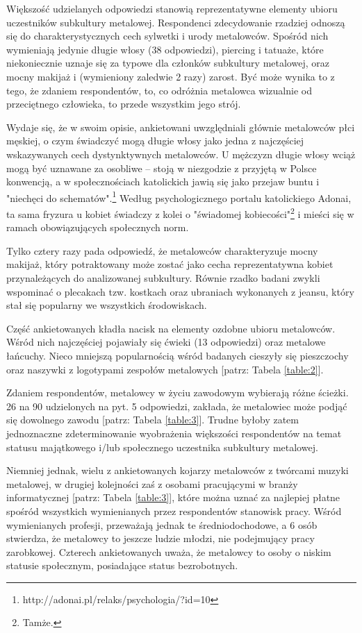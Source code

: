 \documentclass[12pt, a4paper, titlepage]{report}
\begin{document}
Większość udzielanych odpowiedzi stanowią reprezentatywne elementy ubioru uczestników subkultury metalowej. Respondenci zdecydowanie rzadziej odnoszą się do charakterystycznych cech sylwetki i urody metalowców. Spośród nich wymieniają jedynie długie włosy (38 odpowiedzi), piercing i tatuaże, które niekoniecznie uznaje się za typowe dla członków subkultury metalowej, oraz mocny makijaż i (wymieniony zaledwie 2 razy) zarost. Być może wynika to z tego, że zdaniem respondentów, to, co odróżnia metalowca wizualnie od przeciętnego człowieka, to przede wszystkim jego strój. 

Wydaje się, że w swoim opisie, ankietowani uwzględniali głównie metalowców płci męskiej, o czym świadczyć mogą długie włosy jako jedna z najczęściej wskazywanych cech dystynktywnych metalowców. U mężczyzn długie włosy wciąż mogą być uznawane za osobliwe -- stoją w niezgodzie z przyjętą w Polsce konwencją, a w społecznościach katolickich jawią się jako przejaw buntu i "niechęci do schematów".\footnote{http://adonai.pl/relaks/psychologia/?id=10} Według psychologicznego portalu katolickiego Adonai, ta sama fryzura u kobiet świadczy z kolei o "świadomej kobiecości"\footnote{Tamże.} i mieści się w ramach obowiązujących społecznych norm. 

Tylko cztery razy pada odpowiedź, że metalowców charakteryzuje mocny makijaż, który potraktowany może zostać jako cecha reprezentatywna kobiet przynależących do analizowanej subkultury. Równie rzadko badani zwykli wspominać o plecakach tzw. kostkach oraz ubraniach wykonanych z jeansu, który stał się popularny we wszystkich środowiskach.

Część ankietowanych kładła nacisk na elementy ozdobne ubioru metalowców. Wśród nich najczęściej pojawiały się ćwieki (13 odpowiedzi) oraz metalowe łańcuchy. Nieco mniejszą popularnością wśród badanych cieszyły się pieszczochy oraz naszywki z logotypami zespołów metalowych [patrz: Tabela \ref{table:2}].

Zdaniem respondentów, metalowcy w życiu zawodowym wybierają różne ścieżki. 26 na 90 udzielonych na pyt. 5 odpowiedzi, zakłada, że metalowiec może podjąć się dowolnego zawodu [patrz: Tabela \ref{table:3}]. Trudne byłoby zatem jednoznaczne zdeterminowanie wyobrażenia większości respondentów na temat statusu majątkowego i/lub społecznego uczestnika subkultury metalowej. 

Niemniej jednak, wielu z ankietowanych kojarzy metalowców z twórcami muzyki metalowej, w drugiej kolejności zaś z osobami pracującymi w branży informatycznej [patrz: Tabela \ref{table:3}], które można uznać za najlepiej płatne spośród wszystkich wymienianych przez respondentów stanowisk pracy. Wśród wymienianych profesji, przeważają jednak te średniodochodowe, a 6 osób stwierdza, że metalowcy to jeszcze ludzie młodzi, nie podejmujący pracy zarobkowej. Czterech ankietowanych uważa, że metalowcy to osoby o niskim statusie społecznym, posiadające status bezrobotnych.  
\end{document}
